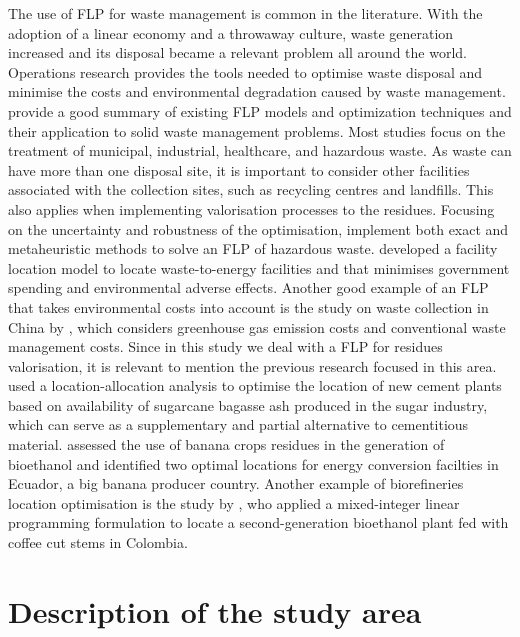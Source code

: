 The use of FLP for waste management is common in the literature. With the adoption of a linear economy and a throwaway culture, waste generation increased and its disposal became a relevant problem all around the world. Operations research provides the tools needed to optimise waste disposal and minimise the costs and environmental degradation caused by waste management. \cite{adeleke2020facility} provide a good summary of existing FLP models and optimization techniques and their application to solid waste management problems. Most studies focus on the treatment of municipal, industrial, healthcare, and hazardous waste. As waste can have more than one disposal site, it is important to consider other facilities associated with the collection sites, such as recycling centres and landfills. This also applies when implementing valorisation processes to the residues. Focusing on the uncertainty and robustness of the optimisation, \cite{berglund2014robust} implement both exact and metaheuristic methods to solve an FLP of hazardous waste. \cite{hu2017bi} developed a facility location model to locate waste-to-energy facilities and that minimises government spending and environmental adverse effects. Another good example of an FLP that takes environmental costs into account is the study on waste collection in China by \cite{wu2020optimization}, which considers greenhouse gas emission costs and conventional waste management costs.  Since in this study we deal with a FLP for residues valorisation, it is relevant to mention the previous research focused in this area. \cite{athira2020effective} used a location-allocation analysis to optimise the location of new cement plants based on availability of sugarcane bagasse ash produced in the sugar industry, which can serve as a supplementary and partial alternative to cementitious material. \cite{guerrero2016gis} assessed the use of banana crops residues in the generation of bioethanol and identified two optimal locations for energy conversion facilties in Ecuador, a big banana producer country. Another example of biorefineries location optimisation is the study by \cite{duarte2014facility}, who applied a mixed-integer linear programming formulation to locate a second-generation bioethanol plant fed with coffee cut stems in Colombia. 


\citep{}

\section{Description of the study area}

